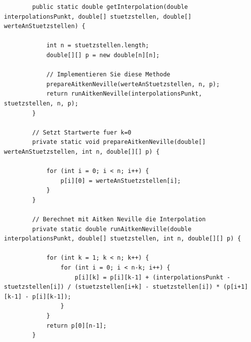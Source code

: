\documentclass{scrartcl}
\begin{document}
	\begin{lstlisting}
		public static double getInterpolation(double interpolationsPunkt, double[] stuetzstellen, double[] werteAnStuetzstellen) {
		
			int n = stuetzstellen.length;
			double[][] p = new double[n][n];
			
			// Implementieren Sie diese Methode
			prepareAitkenNeville(werteAnStuetzstellen, n, p);
			return runAitkenNeville(interpolationsPunkt, stuetzstellen, n, p);
		}
		
		// Setzt Startwerte fuer k=0
		private static void prepareAitkenNeville(double[] werteAnStuetzstellen, int n, double[][] p) {
		
			for (int i = 0; i < n; i++) {
				p[i][0] = werteAnStuetzstellen[i];
			}
		}
		
		// Berechnet mit Aitken Neville die Interpolation
		private static double runAitkenNeville(double interpolationsPunkt, double[] stuetzstellen, int n, double[][] p) {
		
			for (int k = 1; k < n; k++) {
				for (int i = 0; i < n-k; i++) {
					p[i][k] = p[i][k-1] + (interpolationsPunkt - stuetzstellen[i]) / (stuetzstellen[i+k] - stuetzstellen[i]) * (p[i+1][k-1] - p[i][k-1]);
				}
			}
			return p[0][n-1];
		}
	\end{lstlisting}
\end{document}
